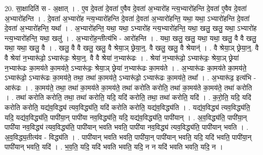 \documentclass[17pt]{extarticle}
\begin{document}
20. सा॒क्षादिति॑ स - अ॒क्षात् । . ए॒व दे॒वता॑ दे॒वता॑ ए॒वैव दे॒वता॑ अ॒भ्यारो॑ह न्त्य॒भ्यारो॑हन्ति दे॒वता॑ ए॒वैव दे॒वता॑ अ॒भ्यारो॑हन्ति । . दे॒वता॑ अ॒भ्यारो॑ह न्त्य॒भ्यारो॑हन्ति दे॒वता॑ दे॒वता॑ अ॒भ्यारो॑हन्ति॒ यथा॒ यथा॒ ऽभ्यारो॑हन्ति दे॒वता॑ दे॒वता॑ अ॒भ्यारो॑हन्ति॒ यथा᳚ । . अ॒भ्यारो॑हन्ति॒ यथा॒ यथा॒ ऽभ्यारो॑ह न्त्य॒भ्यारो॑हन्ति॒ यथा॒ खलु॒ खलु॒ यथा॒ ऽभ्यारो॑ह न्त्य॒भ्यारो॑हन्ति॒ यथा॒ खलु॑ । . अ॒भ्यारो॑ह॒न्तीत्य॑भि - आरो॑हन्ति । . यथा॒ खलु॒ खलु॒ यथा॒ यथा॒ खलु॒ वै वै खलु॒ यथा॒ यथा॒ खलु॒ वै । . खलु॒ वै वै खलु॒ खलु॒ वै श्रेया॒ञ् छ्रेया॒न्॒. वै खलु॒ खलु॒ वै श्रेयान्॑ । . वै श्रेया॒ञ् छ्रेया॒न्॒. वै वै श्रेया॑ न॒भ्यारू॑ढो॒ ऽभ्यारू॑ढः॒ श्रेया॒न्॒. वै वै श्रेया॑ न॒भ्यारू॑ढः । . श्रेया॑ न॒भ्यारू॑ढो॒ ऽभ्यारू॑ढः॒ श्रेया॒ञ् छ्रेया॑ न॒भ्यारू॑ढः का॒मय॑ते का॒मय॑ते॒ ऽभ्यारू॑ढः॒ श्रेया॒ञ् छ्रेया॑ न॒भ्यारू॑ढः का॒मय॑ते । . अ॒भ्यारू॑ढः का॒मय॑ते का॒मय॑ते॒ ऽभ्यारू॑ढो॒ ऽभ्यारू॑ढः का॒मय॑ते॒ तथा॒ तथा॑ का॒मय॑ते॒ ऽभ्यारू॑ढो॒ ऽभ्यारू॑ढः का॒मय॑ते॒ तथा᳚ । . अ॒भ्यारू॑ढ॒ इत्य॑भि - आरू॑ढः । . का॒मय॑ते॒ तथा॒ तथा॑ का॒मय॑ते का॒मय॑ते॒ तथा॑ करोति करोति॒ तथा॑ का॒मय॑ते का॒मय॑ते॒ तथा॑ करोति । . तथा॑ करोति करोति॒ तथा॒ तथा॑ करोति॒ यदि॒ यदि॑ करोति॒ तथा॒ तथा॑ करोति॒ यदि॑ । . क॒रो॒ति॒ यदि॒ यदि॑ करोति करोति॒ यद्य॑व॒विद्ध्य॑ त्यव॒विद्ध्य॑ति॒ यदि॑ करोति करोति॒ यद्य॑व॒विद्ध्य॑ति । . यद्य॑व॒विद्ध्य॑ त्यव॒विद्ध्य॑ति॒ यदि॒ यद्य॑व॒विद्ध्य॑ति॒ पापी॑या॒न् पापी॑या नव॒विद्ध्य॑ति॒ यदि॒ यद्य॑व॒विद्ध्य॑ति॒ पापी॑यान् । . अ॒व॒विद्ध्य॑ति॒ पापी॑या॒न् पापी॑या नव॒विद्ध्य॑ त्यव॒विद्ध्य॑ति॒ पापी॑यान् भवति भवति॒ पापी॑या नव॒विद्ध्य॑ त्यव॒विद्ध्य॑ति॒ पापी॑यान् भवति । . अ॒व॒विद्ध्य॒तीत्य॑व - विद्ध्य॑ति । . पापी॑यान् भवति भवति॒ पापी॑या॒न् पापी॑यान् भवति॒ यदि॒ यदि॑ भवति॒ पापी॑या॒न् पापी॑यान् भवति॒ यदि॑ । . भ॒व॒ति॒ यदि॒ यदि॑ भवति भवति॒ यदि॒ न न यदि॑ भवति भवति॒ यदि॒ न । \newline
\end{document}
